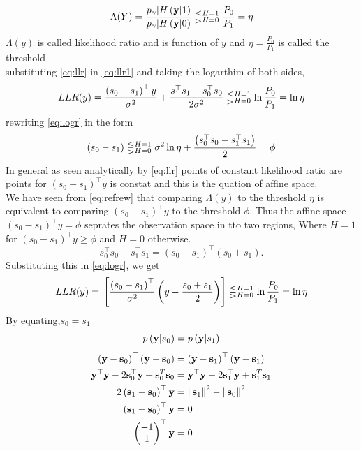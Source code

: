 \begin{enumerate}
\begin{align}
\Lambda(Y)=\frac{p_\gamma|H \left(\mathbf{y}|1\right)}{p_\gamma|H \left(\mathbf{y}|0\right)} \lesseqgtr_{H=0}^{H=1}  \frac{P_0}{P_1} = \eta
\label{eq:llr1}
\end{align}
$\Lambda(y)$ is called likelihood ratio and is function of $y$ and $\eta =\frac{P_0}{P_1}$ is called the threshold \\
substituting \eqref{eq:llr} in \eqref{eq:llr1} and taking the logarthim of both sides,
\begin{align}
LLR(y) = \frac{\left( s_0 -s_1\right)^\top y}{\sigma^2}+\frac{s_1^\top s_1 - s_0^\top s_0}{2\sigma^2} \lesseqgtr_{H=0}^{H=1}  \ln\frac{P_0}{P_1} = \ln\eta
\label{eq:logr}
\end{align}
rewriting \ref{eq:logr} in the form 
\begin{align}
\left( s_0 -s_1\right) \lesseqgtr_{H=0}^{H=1} \sigma^2 \ln{\eta} + \frac{\left(s_0^\top s_0 -s_1^\top s_1\right)}{2} = \phi
\label{eq:refrew}
\end{align}
In general as seen analytically by \ref{eq:llr} points of constant likelihood ratio are points for $(s_0 -s_1)^\top y $ is constat and this is the quation of affine space.\\
We have seen from \ref{eq:refrew} that comparing $\Lambda(y)$ to the threshold $\eta$ is equivalent to comparing $(s_0 -s_1)^\top y $ to the threshold $\phi$. Thus the affine space $(s_0 -s_1)^\top y = \phi $ seprates the observation space in tto two regions, Where $ H =1$ for $(s_0 -s_1)^\top y \geq \phi $  and $ H=0$ otherwise.
\begin{equation}
s_0^\top s_0 -s_1^\top s_1 = (s_0 -s_1)^\top (s_0 +s_1).
\end{equation}
Substituting this in \eqref{eq:logr}, we get
\begin{align}
LLR(y)  = {}\left[\frac{\left(s_0 -s_1\right)^\top}{\sigma^2} \left(y - \frac{s_0 + s_1}{2} \right)\right] \lesseqgtr_{H=0}^{H=1} \ln\frac{P_0}{P_1} = \ln\eta
\label{final}
\end{align}
By equating,$s_0 =s_1$
\begin{equation}
p\left(\mathbf{y}|s_0\right)=p\left(\mathbf{y}|s_1\right)
\label{eq:map_bfsk_dec1}
\end{equation}
\begin{align}
\left(\mathbf{y}-\mathbf{s}_0\right)^\top \left(\mathbf{y}-\mathbf{s}_0\right) &= \left(\mathbf{y}-\mathbf{s}_1\right)^\top \left(\mathbf{y}-\mathbf{s}_1\right)\\
\mathbf{y}^\top\mathbf{y} - 2\mathbf{s}_0^\top \mathbf{y} + \mathbf{s}_0^T\mathbf{s}_0 &= \mathbf{y}^\top\mathbf{y} - 2\mathbf{s}_1^\top \mathbf{y} + \mathbf{s}_1^T\mathbf{s}_1\\
 2\left(\mathbf{s}_1-\mathbf{s}_0\right)^\top \mathbf{y} &= \left\lVert\mathbf{s}_1\right\rVert^2 - \left\lVert\mathbf{s}_0\right\rVert^2\\
\left(\mathbf{s}_1-\mathbf{s}_0\right)^\top \mathbf{y} &= 0\\
\begin{pmatrix}-1\\1\end{pmatrix}^\top \mathbf{y} &= 0
\end{align}


\end{enumerate}
